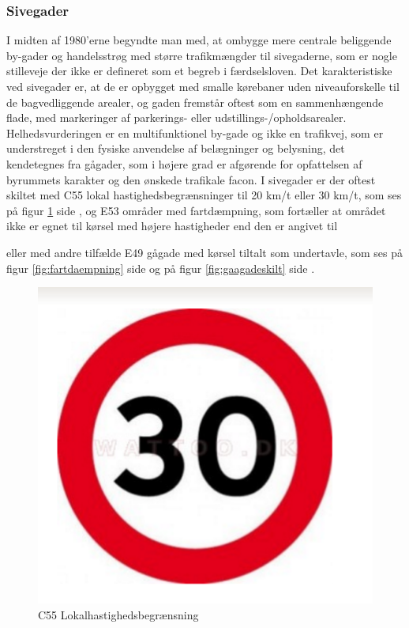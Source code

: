 \subsubsection{Sivegader}
\label{subs:sivegader}

I midten af 1980’erne begyndte man med, at ombygge mere centrale beliggende by-gader og handelsstrøg med større trafikmængder til sivegaderne, som er nogle stilleveje der ikke er defineret som et begreb i færdselsloven. Det karakteristiske ved sivegader er, at de er opbygget med smalle kørebaner uden niveauforskelle til de bagvedliggende arealer, og gaden fremstår oftest som en sammenhængende flade, med markeringer af parkerings- eller udstillings-/opholdsarealer. Helhedsvurderingen er en multifunktionel by-gade og ikke en trafikvej, som er understreget i den fysiske anvendelse af belægninger og belysning, det kendetegnes fra gågader, som i højere grad er afgørende for opfattelsen af byrummets karakter og den ønskede trafikale facon. I sivegader er der oftest skiltet med C55 lokal hastighedsbegrænsninger til 20 km/t eller 30 km/t, som ses på figur \cref{fig:lokalhastighedfart} side \pageref{fig:lokalhastighedfart}, og E53 områder med fartdæmpning, som fortæller at området ikke er egnet til kørsel med højere hastigheder end den er angivet til\autocite{hs}


eller med andre tilfælde E49 gågade med kørsel tiltalt som undertavle, som ses på figur \cref{fig:fartdaempning} side \pageref{fig:fartdaempning} og på figur \cref{fig:gaagadeskilt} side \pageref{fig:gaagadeskilt}.\autocite{vejlednigomss2013}

\begin{figure}[htbp]
  \centering
  \begin{adjustbox}{max width=\textwidth}
    \includegraphics[scale=0.3]{figures/Billederogfigur/Indledningen/lokal_hastighedsberaensning_c55_30km.png}
 \end{adjustbox}
  \caption{C55 Lokalhastighedsbegrænsning \autocite{forbudsskilt2007}}
    \label{fig:lokalhastighedfart}
\end{figure}

